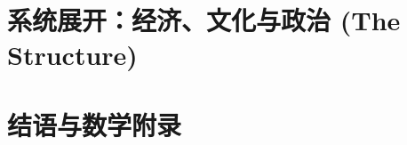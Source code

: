\documentclass[openany, a4paper, 12pt]{book}
\begin{document}
	\part{系统展开：经济、文化与政治 (The Structure)}
	
	
	
	
	
	\part{结语与数学附录}
	
	
	\appendix
	
	
	\backmatter
	
	
\end{document}

